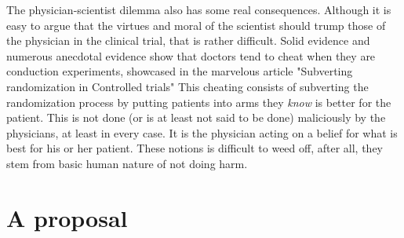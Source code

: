 \documentclass[12p]{article}
\begin{document}
The physician-scientist dilemma also has some real consequences.
Although it is easy to argue that the virtues and moral of the scientist should trump those of the physician in the clinical trial, that is rather difficult.
Solid evidence and numerous anecdotal evidence show that doctors tend to cheat when they are conduction experiments, showcased in the marvelous article "Subverting randomization in Controlled trials" \cite{mdcheat}
This cheating consists of subverting the randomization process by putting patients into arms they \emph{know} is better for the patient.
This is not done (or is at least not said to be done) maliciously by the physicians, at least in every case.
It is the physician acting on a belief for what is best for his or her patient.
These notions is difficult to weed off, after all, they stem from basic human nature of not doing harm.

\section*{A proposal}
\end{document}
